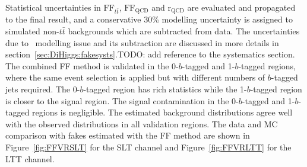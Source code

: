 Statistical uncertainties in $\text{FF}_{t\bar{t}}$, $\text{FF}_\text{QCD}$ and $\mathrm{r}_\text{QCD}$
are evaluated and propagated to the final result,
and a conservative 30\% modelling uncertainty is assigned to simulated non-$t\bar t$ backgrounds
which are subtracted from data.
The uncertainties due to \ttbar\ modelling issue and its subtraction are discussed in more details
in section~\ref{sec:DiHiggs:fakesysts}.TODO: add reference to the systematics section.
The combined FF method is validated in
the 0-$b$-tagged and 1-$b$-tagged regions, where the same event selection is applied 
but with different numbers of $b$-tagged jets required. 
The 0-$b$-tagged region has rich statistics while 
the 1-$b$-tagged region is closer to the signal region.
The signal contamination in the 0-$b$-tagged and 1-$b$-tagged regions is negligible.
The estimated background distributions agree well with the observed distributions in all validation regions.
The data and MC comparison with fakes estimated with the FF method 
are shown in Figure~\ref{fig:FFVRSLT} for the SLT channel and
Figure~\ref{fig:FFVRLTT} for the LTT channel. 

